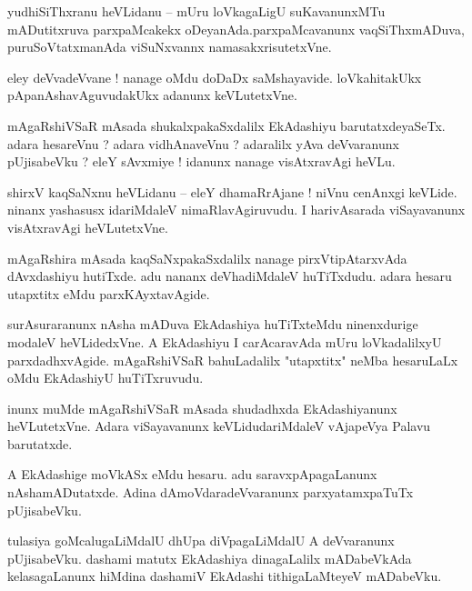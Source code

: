 \documentclass{article}
\begin{document}
\begin{mn}%
yudhiSiThxranu heVLidanu -- mUru loVkagaLigU suKavanunxMTu mADutitxruva parxpaMcakekx 
oDeyanAda.parxpaMcavanunx vaqSiThxmADuva, puruSoVtatxmanAda viSuNxvannx namasakxrisutetxVne.
\end{mn}

\begin{mn}%
eley deVvadeVvane ! nanage oMdu doDaDx saMshayavide. loVkahitakUkx pApanAshavAguvudakUkx adanunx 
keVLutetxVne.
\end{mn}

\begin{mn}%
mAgaRshiVSaR mAsada shukalxpakaSxdalilx EkAdashiyu barutatxdeyaSeTx. adara hesareVnu ? adara 
vidhAnaveVnu ? adaralilx yAva deVvaranunx pUjisabeVku ? eleY sAvxmiye ! idanunx nanage 
visAtxravAgi heVLu.
\end{mn}

\begin{mn}%
shirxV kaqSaNxnu heVLidanu -- eleY dhamaRrAjane ! niVnu cenAnxgi keVLide. ninanx yashasusx 
idariMdaleV nimaRlavAgiruvudu. I harivAsarada viSayavanunx visAtxravAgi heVLutetxVne.
\end{mn}

\begin{mn}%
mAgaRshira mAsada kaqSaNxpakaSxdalilx nanage pirxVtipAtarxvAda dAvxdashiyu hutiTxde. adu nananx 
deVhadiMdaleV huTiTxdudu. adara hesaru utapxtitx eMdu parxKAyxtavAgide.
\end{mn}

\begin{mn}%
surAsuraranunx nAsha mADuva EkAdashiya huTiTxteMdu ninenxdurige modaleV heVLidedxVne. A EkAdashiyu 
I carAcaravAda mUru loVkadalilxyU parxdadhxvAgide. mAgaRshiVSaR bahuLadalilx "utapxtitx" neMba 
hesaruLaLx oMdu EkAdashiyU huTiTxruvudu.
\end{mn}

\begin{mn}%
inunx muMde mAgaRshiVSaR mAsada shudadhxda EkAdashiyanunx heVLutetxVne. Adara viSayavanunx 
keVLidudariMdaleV vAjapeVya Palavu barutatxde.
\end{mn}

\begin{mn}%
A EkAdashige moVkASx eMdu hesaru. adu saravxpApagaLanunx nAshamADutatxde. Adina 
dAmoVdaradeVvaranunx parxyatamxpaTuTx pUjisabeVku.
\end{mn}

\begin{mn}%
tulasiya goMcalugaLiMdalU dhUpa diVpagaLiMdalU A deVvaranunx pUjisabeVku. dashami matutx EkAdashiya 
dinagaLalilx mADabeVkAda kelasagaLanunx hiMdina dashamiV EkAdashi tithigaLaMteyeV mADabeVku.
\end{mn}
\end{document}
